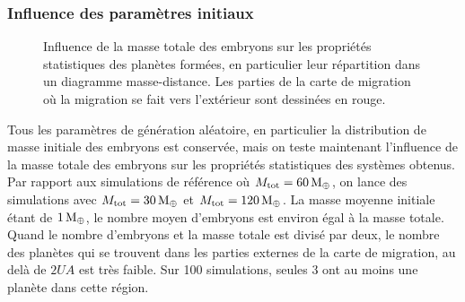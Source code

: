 \subsubsection{Influence des paramètres initiaux}
\begin{figure}[htbp]
\centering
{}\hfill
{}

\caption{Influence de la masse totale des embryons sur les propriétés statistiques des planètes formées, en particulier leur répartition dans un diagramme masse-distance. Les parties de la carte de migration où la migration se fait vers l'extérieur sont dessinées en rouge.}\label{fig:HSE_m_tot_influence}
\end{figure}

Tous les paramètres de génération aléatoire, en particulier la distribution de masse initiale des embryons est conservée, mais on teste maintenant l'influence de la masse totale des embryons sur les propriétés statistiques des systèmes obtenus. Par rapport aux simulations de référence où $M_\text{tot}=60\mathrm{\thinspace M_\oplus}$, on lance des simulations avec $M_\text{tot}=30\mathrm{\thinspace M_\oplus}$ et $M_\text{tot}=120\mathrm{\thinspace M_\oplus}$. La masse moyenne initiale étant de $1\mathrm{\thinspace M_\oplus}$, le nombre moyen d'embryons est environ égal à la masse totale. Quand le nombre d'embryons et la masse totale est divisé par deux, le nombre des planètes qui se trouvent dans les parties externes de la carte de migration, au delà de $2\unit{UA}$ est très faible. Sur 100 simulations, seules 3 ont au moins une planète dans cette région. 

